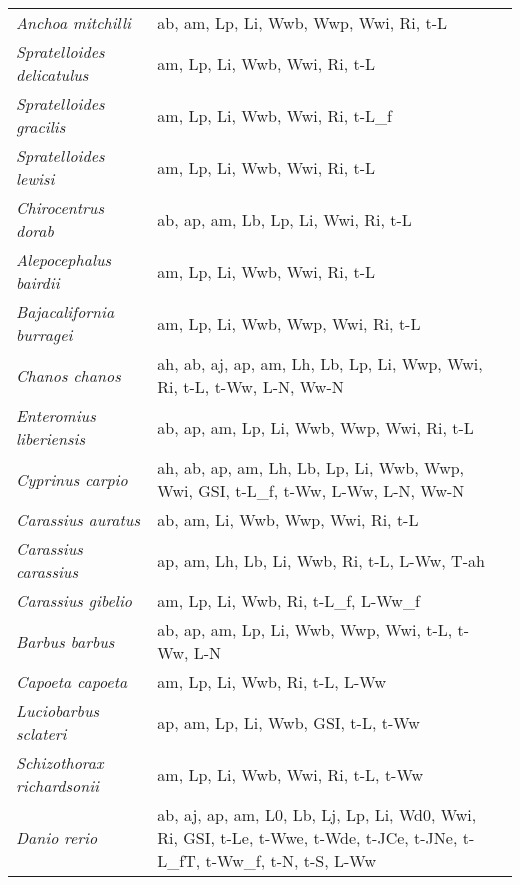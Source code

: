 {\begin{longtable}[c]{p{3.5cm}p{5.5cm}p{5.5cm}}
\emph{Anchoa mitchilli} &  ab, am, Lp, Li, Wwb, Wwp, Wwi, Ri, t-L & \citet{Acos2000} \\
\emph{Spratelloides delicatulus} &  am, Lp, Li, Wwb, Wwi, Ri, t-L & \citet{MiltBlab1991,ShirWata2007} \\
\emph{Spratelloides gracilis} &  am, Lp, Li, Wwb, Wwi, Ri, t-L\_f & \citet{MiltBlab1991,ShirWata2007} \\
\emph{Spratelloides lewisi} &  am, Lp, Li, Wwb, Wwi, Ri, t-L & \citet{MiltBlab1991,ShirWata2007} \\
\emph{Chirocentrus dorab} &  ab, ap, am, Lb, Lp, Li, Wwi, Ri, t-L & \citet{Dels1930,Rich2008,AbduPill2011,Luth1985} \\
\emph{Alepocephalus bairdii} &  am, Lp, Li, Wwb, Wwi, Ri, t-L & \citet{AllaLora2000} \\
\emph{Bajacalifornia burragei} &  am, Lp, Li, Wwb, Wwp, Wwi, Ri, t-L & \citet{ChilTayl1980} \\
\emph{Chanos chanos} &  ah, ab, aj, ap, am, Lh, Lb, Lp, Li, Wwp, Wwi, Ri, t-L, t-Ww, L-N, Ww-N & \citet{Baga1991,SumaBorl1995} \\
\emph{Enteromius liberiensis} &  ab, ap, am, Lp, Li, Wwb, Wwp, Wwi, Ri, t-L & \citet{Payn1976,Weim2007} \\
\emph{Cyprinus carpio} &  ah, ab, ap, am, Lh, Lb, Lp, Li, Wwb, Wwp, Wwi, GSI, t-L\_f, t-Ww, L-Ww, L-N, Ww-N & \citet{NjouTcho2013,WiltEmme2008,Balicubu2006,Criv1981,Donk2011,KaraSeze2005} \\
\emph{Carassius auratus} &  ab, am, Li, Wwb, Wwp, Wwi, Ri, t-L & \citet{OrteReye2006,LoreCorb2007} \\
\emph{Carassius carassius} &  ap, am, Lh, Lb, Li, Wwb, Ri, t-L, L-Ww, T-ah & \citet{Wijm2009} \\
\emph{Carassius gibelio} &  am, Lp, Li, Wwb, Ri, t-L\_f, L-Ww\_f & \citet{MariLuji2016} \\
\emph{Barbus barbus} &  ab, ap, am, Lp, Li, Wwb, Wwp, Wwi, t-L, t-Ww, L-N & \citet{Weim2007} \\
\emph{Capoeta capoeta} &  am, Lp, Li, Wwb, Ri, t-L, L-Ww & \citet{TurkErdo2002} \\
\emph{Luciobarbus sclateri} &  ap, am, Lp, Li, Wwb, GSI, t-L, t-Ww & \citet{HerrHern1988} \\
\emph{Schizothorax richardsonii} &  am, Lp, Li, Wwb, Wwi, Ri, t-L, t-Ww & \citet{JoshDas2016,SingShar1995} \\
\emph{Danio rerio} &  ab, aj, ap, am, L0, Lb, Lj, Lp, Li, Wd0, Wwi, Ri, GSI, t-Le, t-Wwe, t-Wde, t-JCe, t-JNe, t-L\_fT, t-Ww\_f, t-N, t-S, L-Ww & \citet{BestAdat2010,GerhKauf2002,ForbPres2010,Schi2002,SpenGerl2008,Augu2009,BagaPels2001,BangGron2004,LawrEber2008,BeauGous2015,GeffSimo2013,DrewRodn2008,Baye2005} \\

\end{longtable}}
